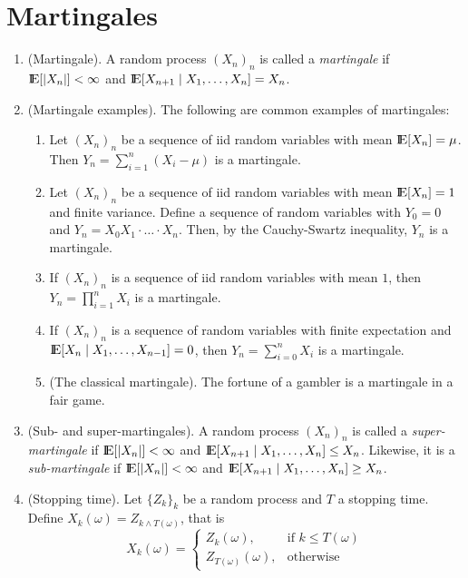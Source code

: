 \documentclass[a4paper,10pt]{scrbook}
\begin{document}
\section{Martingales}
\begin{enumerate}
 \item (Martingale). A random process $(X_n)_n$ is called a \textit{martingale} if 
		     $\E[|X_n|]<\infty$ and $\E[X_{n+1}{}\mid{}X_1,\ldots, X_n]=X_{n}$.
 \item (Martingale examples). The following are common examples of martingales:
  \begin{enumerate}
   \item Let $(X_n)_n$ be a sequence of iid random variables with mean $\E[X_n]=\mu$. Then
         $Y_n = \sum_{i=1}^{n}(X_i-\mu)$ is a martingale.
   \item Let $(X_n)_n$ be a sequence of iid random variables with mean $\E[X_n]=1$ and finite
         variance. Define a sequence of random variables with \(Y_0=0\) and 
         \(Y_n = X_0 X_1 \cdot \ldots \cdot X_n\). Then, by the Cauchy-Swartz inequality,
         \(Y_n\) is a martingale.
   \item If $(X_n)_n$ is a sequence of iid random variables with mean $1$, then 
         $Y_n = \prod_{i=1}^{n}X_i$ is a martingale.
   \item If $(X_n)_n$ is a sequence of random variables with finite expectation and 
         $\E[X_n{}\mid{}X_1,\ldots,X_{n-1}]=0$, then $Y_n=\sum_{i=0}^{n}X_i$ is a 
         martingale.
   \item (The classical martingale). The fortune of a gambler is a martingale in a fair game.
  \end{enumerate}
 \item (Sub- and super-martingales). A random process $(X_n)_n$ is called a \textit{super-martingale} if 
		     $\E[|X_n|]<\infty$ and $\E[X_{n+1}{}\mid{}X_1,\ldots, X_n]\leq X_{n}$. Likewise, it 
		     is a \textit{sub-martingale} if $\E[|X_n|]<\infty$ and $\E[X_{n+1}{}\mid{}X_1,\ldots, X_n]\geq X_{n}$.
 \item (Stopping time). Let $\{Z_k\}_k$ be a random process and $T$ a stopping time. 
       Define $X_k(\omega) = Z_{k\wedge T(\omega)}$, that is
       \[
        X_k(\omega) = \begin{cases}
                       Z_k(\omega),&\text{if }k \leq T(\omega)\\
                       Z_{T(\omega)}(\omega),&\text{otherwise}
                      \end{cases}
\]
\end{enumerate}
\end{document}
